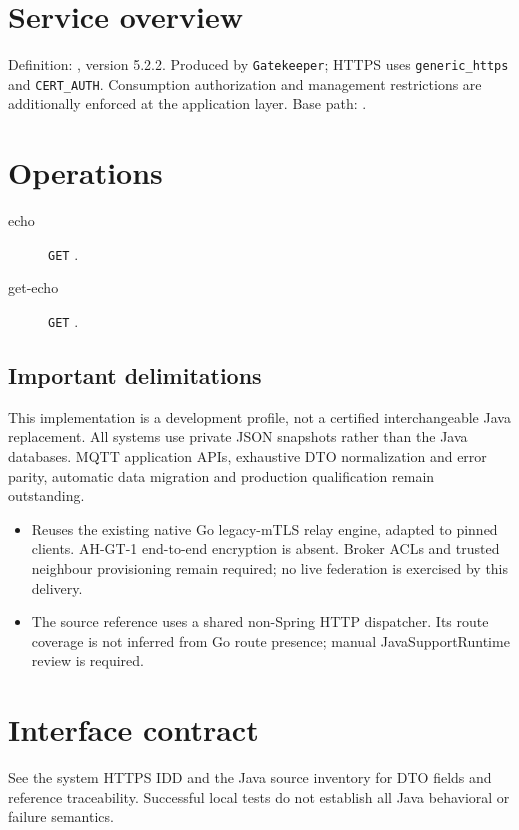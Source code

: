 \documentclass[a4paper]{arrowhead}
\begin{document}
\ArrowheadSetup
\section{Service overview}
Definition: , version 5.2.2. Produced by \texttt{Gatekeeper}; HTTPS uses \texttt{generic\_https} and \texttt{CERT\_AUTH}. Consumption authorization and management restrictions are additionally enforced at the application layer. Base path: .
\section{Operations}
\begin{description}
\item[echo] \texttt{GET} .
\item[get-echo] \texttt{GET} .
\end{description}
\subsection{Important delimitations}
This implementation is a development profile, not a certified interchangeable Java replacement. All systems use private JSON snapshots rather than the Java databases. MQTT application APIs, exhaustive DTO normalization and error parity, automatic data migration and production qualification remain outstanding.
\begin{itemize}
\item Reuses the existing native Go legacy-mTLS relay engine, adapted to pinned clients. AH-GT-1 end-to-end encryption is absent. Broker ACLs and trusted neighbour provisioning remain required; no live federation is exercised by this delivery.
\item The source reference uses a shared non-Spring HTTP dispatcher. Its route coverage is not inferred from Go route presence; manual JavaSupportRuntime review is required.
\end{itemize}
\section{Interface contract}
See the system HTTPS IDD and the Java source inventory for DTO fields and reference traceability. Successful local tests do not establish all Java behavioral or failure semantics.
\end{document}
